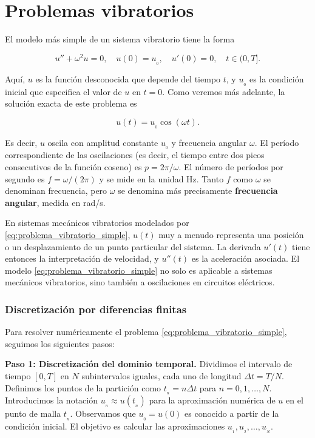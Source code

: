 \chapter{Problemas vibratorios}
\label{chap:problemas_vibratorios}

El modelo más simple de un sistema vibratorio tiene la forma

\begin{equation}
    u'' + \omega^2 u = 0, \quad u(0) = u_{_0}, \quad u'(0) = 0, \quad t \in (0, T].
    \label{eq:problema_vibratorio_simple}
\end{equation}

Aquí, $u$ es la función desconocida que depende del tiempo $t$, y $u_{_0}$ es la condición inicial que especifica el
valor de $u$ en $t = 0$. Como veremos más adelante, la solución exacta de este problema es

\begin{equation}
    u(t) = u_{_0} \cos(\omega t).
    \label{eq:solucion_exacta_problema_vibratorio_simple}
\end{equation}

Es decir, $u$ oscila con amplitud constante $u_{_0}$ y frecuencia angular $\omega$. El período correspondiente de las
oscilaciones (es decir, el tiempo entre dos picos consecutivos de la función coseno) es $p = 2\pi/\omega$. El número de
períodos por segundo es $f = \omega/(2\pi)$ y se mide en la unidad Hz. Tanto $f$ como $\omega$ se denominan frecuencia,
pero $\omega$ se denomina más precisamente \textbf{frecuencia angular}, medida en rad/s.

En sistemas mecánicos vibratorios modelados por \eqref{eq:problema_vibratorio_simple}, $u(t)$ muy a menudo representa
una posición o un desplazamiento de un punto particular del sistema. La derivada $u'(t)$ tiene entonces la
interpretación de velocidad, y $u''(t)$ es la aceleración asociada. El modelo \eqref{eq:problema_vibratorio_simple} no
solo es aplicable a sistemas mecánicos vibratorios, sino también a oscilaciones en circuitos eléctricos.

\subsection{Discretización por diferencias finitas}

Para resolver numéricamente el problema \eqref{eq:problema_vibratorio_simple}, seguimos los siguientes pasos:

\textbf{Paso 1: Discretización del dominio temporal.} Dividimos el intervalo de tiempo $[0, T]$ en $N$ subintervalos
iguales, cada uno de longitud $\Delta t = T/N$. Definimos los puntos de la partición como $t_{_n} = n \Delta t$ para $n = 0, 1,
    \ldots, N$. Introducimos la notación $u_{_n} \approx u(t_{_n})$ para la aproximación numérica de $u$ en el punto de malla
$t_{_n}$. Observamos que $u_{_0} = u(0)$ es conocido a partir de la condición inicial. El objetivo es calcular las
aproximaciones $u_{_1}, u_{_2}, \ldots, u_{_N}$.

